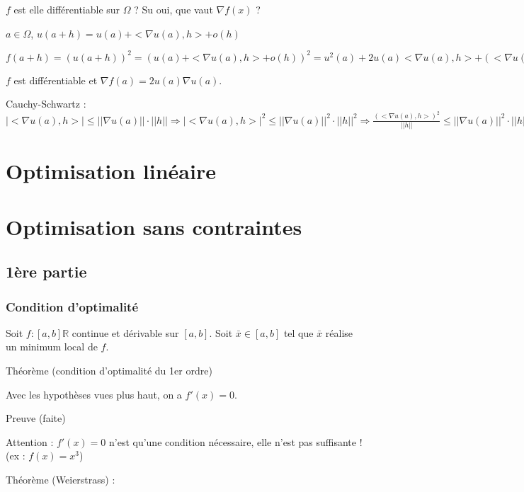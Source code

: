 		$f$ est elle différentiable sur $\Omega$ ? Su oui, que vaut $ \nabla f(x)$ ?
		
		$a \in \Omega$, $u(a+h) = u(a) + <\nabla u(a), h> + o(h)$
		
		$f(a+h) = (u(a+h))^2 = (u(a) + <\nabla u(a), h> + o(h))^2 = u^2(a) + 2u(a)<\nabla u(a), h> +(<\nabla u(a), h>)^2 + \dots = f(a) + <2u(a)\nabla u(a), h> + o(h)$
		
		$f$ est différentiable et $\nabla f(a) = 2u(a) \nabla u(a)$.
		
		Cauchy-Schwartz : $|<\nabla u(a), h>| \leq ||\nabla u(a)|| \cdot ||h|| \Rightarrow |<\nabla u(a), h>|^2 \leq ||\nabla u(a)||^2 \cdot ||h||^2 \Rightarrow \frac{ (<\nabla u(a), h>)^2 }{||h||} \leq ||\nabla u(a)||^2 \cdot ||h|| \rightarrow_{||h|| \rightarrow 0} 0 \Rightarrow (< \nabla u(a), h>)^2 = o(h)$

		
		
\section{Optimisation linéaire}
		
		
\section{Optimisation sans contraintes}

	\subsection{1ère partie}
	
		\subsubsection{Condition d'optimalité}
		
		Soit $f : [a, b] \mathbb{R}$ continue et dérivable sur $[a,  b]$.
		Soit $\bar{x} \in [a, b]$ tel que $\bar{x}$ réalise un minimum local de $f$.
		
		Théorème (condition d'optimalité du 1er ordre)
		
		Avec les hypothèses vues plus haut, on a $f'(x) = 0$.
		
		Preuve (faite)
		
		Attention : $f'(x) = 0$ n'est qu'une condition nécessaire, elle n'est pas suffisante ! (ex : $f(x) = x^3$)
		
		Théorème (Weierstrass) :
		

